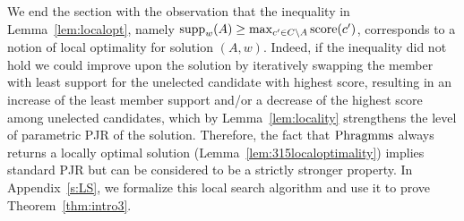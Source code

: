 We end the section with the observation that the inequality in Lemma~\ref{lem:localopt}, namely $\operatorname{supp}_w(A)\geq \max_{c'\in C\setminus A} \operatorname{score}(c')$, corresponds to a notion of local optimality for solution $(A,w)$. 
Indeed, if the inequality did not hold we could improve upon the solution by iteratively swapping the member with least support for the unelected candidate with highest score, resulting in an increase of the least member support and/or a decrease of the highest score among unelected candidates, which by Lemma~\ref{lem:locality} strengthens the level of parametric PJR of the solution. 
Therefore, the fact that $\operatorname{Phragmms}$ always returns a locally optimal solution (Lemma~\ref{lem:315localoptimality}) implies standard PJR but can be considered to be a strictly stronger property. 
In Appendix~\ref{s:LS}, we formalize this local search algorithm and use it to prove Theorem~\ref{thm:intro3}.
